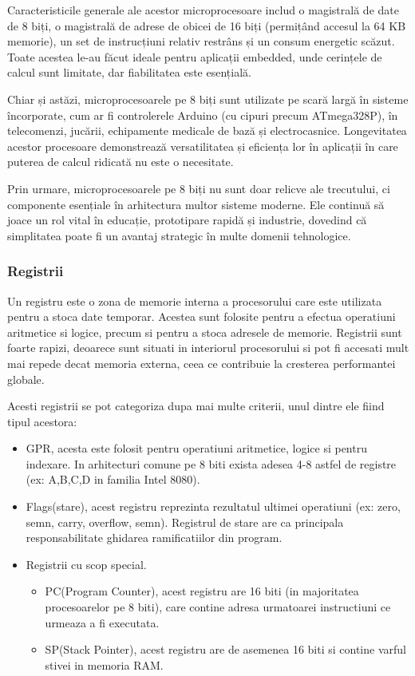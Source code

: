 \documentclass[titlepage,12pt]{article}
\begin{document}
    Caracteristicile generale ale acestor microprocesoare includ o magistrală de date de 8 biți, o magistrală de adrese de obicei de 16 biți (permițând accesul la 64 KB memorie), un set de instrucțiuni relativ restrâns și un consum energetic scăzut. Toate acestea le-au făcut ideale pentru aplicații embedded, unde cerințele de calcul sunt limitate, dar fiabilitatea este esențială.

    Chiar și astăzi, microprocesoarele pe 8 biți sunt utilizate pe scară largă în sisteme încorporate, cum ar fi controlerele Arduino (cu cipuri precum ATmega328P), în telecomenzi, jucării, echipamente medicale de bază și electrocasnice. Longevitatea acestor procesoare demonstrează versatilitatea și eficiența lor în aplicații în care puterea de calcul ridicată nu este o necesitate.

    Prin urmare, microprocesoarele pe 8 biți nu sunt doar relicve ale trecutului, ci componente esențiale în arhitectura multor sisteme moderne. Ele continuă să joace un rol vital în educație, prototipare rapidă și industrie, dovedind că simplitatea poate fi un avantaj strategic în multe domenii tehnologice.

    \subsubsection{Registrii}

    Un registru este o zona de memorie interna a procesorului care este utilizata pentru a stoca date temporar. Acestea sunt folosite pentru a efectua operatiuni aritmetice si logice, precum si pentru a stoca adresele de memorie.
    Registrii sunt foarte rapizi, deoarece sunt situati in interiorul procesorului si pot fi accesati mult mai repede decat memoria externa, ceea ce contribuie la cresterea performantei globale.

    Acesti registrii se pot categoriza dupa mai multe criterii, unul dintre ele fiind tipul acestora:
    \begin{itemize}

        \item \ac {GPR}, acesta este folosit pentru operatiuni aritmetice, logice si pentru indexare. In arhitecturi comune pe 8 biti exista adesea 4-8 astfel de registre (ex: A,B,C,D in familia Intel 8080).
        \item Flags(stare), acest registru reprezinta rezultatul ultimei operatiuni (ex: zero, semn, carry, overflow, semn). Registrul de stare are ca principala responsabilitate ghidarea ramificatiilor din program.
        \item Registrii cu scop special.
        \begin{itemize}
            \item PC(Program Counter), acest registru are 16 biti (in majoritatea procesoarelor pe 8 biti), care contine adresa urmatoarei instructiuni ce urmeaza a fi executata.
            \item SP(Stack Pointer), acest registru are de asemenea 16 biti si contine varful stivei in memoria RAM.
        \end{itemize}

    \end{itemize}
\end{document}
